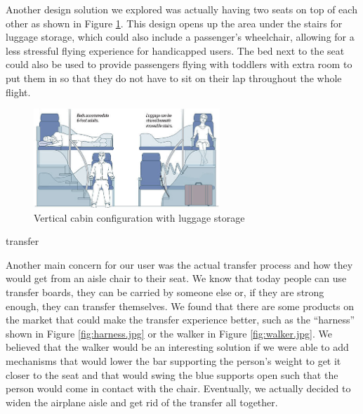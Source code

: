 Another design solution we explored was actually having two seats on top of each other as shown in Figure \ref{fig:vertical_with_luggage.jpg}. This design opens up the area under the stairs for luggage storage, which could also include a passenger’s wheelchair, allowing for a less stressful flying experience for handicapped users. The bed next to the seat could also be used to provide passengers flying with toddlers with extra room to put them in so that they do not have to sit on their lap throughout the whole flight. 

\begin{figure}[h]
  \centering
     \includegraphics[width=7cm]{images/vertical_with_luggage.jpg}
   \caption{Vertical cabin configuration with luggage storage} %
  \label{fig:vertical_with_luggage.jpg}
\end{figure} 
transfer

Another main concern for our user was the actual transfer process and how they would get from an aisle chair to their seat. We know that today people can use transfer boards, they can be carried by someone else or, if they are strong enough, they can transfer themselves. We found that there are some products on the market that could make the transfer experience better, such as the “harness” shown in Figure \ref{fig:harness.jpg} or the walker in Figure \ref{fig:walker.jpg}. We believed that the walker would be an interesting solution if we were able to add mechanisms  that would lower the bar supporting the person’s weight to get it closer to the seat and that would swing the blue supports open such that the person would come in contact with the chair. Eventually, we actually decided to widen the airplane aisle and get rid of the transfer all together. 

